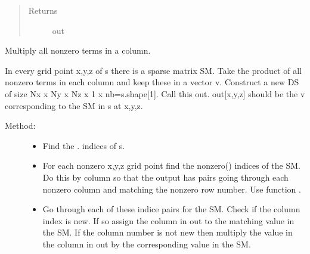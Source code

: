 \documentclass[letterpaper,10pt,english]{sphinxmanual}
\begin{document}
\begin{fulllineitems}
\begin{fulllineitems}
\begin{quote}
\begin{description}
\item[{Returns}] \leavevmode
out

\end{description}\end{quote}

\end{fulllineitems}


\begin{fulllineitems}
\label{index:DictionarySparseMatrix.DS.dict_col_mult}
Multiply all nonzero terms in a column.

In every grid point x,y,z of s there is a sparse matrix SM.     Take the product of all nonzero terms in each column and     keep these in a vector v.
Construct a new DS of size Nx x Ny x Nz x 1 x nb=s.shape{[}1{]}.    Call this out. out{[}x,y,z{]} should be the v corresponding     to the SM in s at x,y,z.
\begin{description}
\item[{Method:}] \leavevmode\begin{itemize}
\item {} 
Find the {\hyperref[index:DictionarySparseMatrix.DS]{}}. {\hyperref[index:DictionarySparseMatrix.DS.nonzero]{}} indices of s.

\item {} 
For each nonzero x,y,z grid point find the       nonzero() indices of the SM. Do this by column so       that the output has pairs going through       each nonzero column and matching the nonzero row       number. Use function {\hyperref[index:DictionarySparseMatrix.nonzero_bycol]{}}.

\item {} 
Go through each of these indice pairs for the SM.       Check if the column index is new. If so assign       the column in out to the matching       value in the SM. If the column number is not       new then multiply the value in the column in       out by the corresponding value in the SM.

\end{itemize}

\end{description}


\end{fulllineitems}
\end{fulllineitems}
\end{document}
